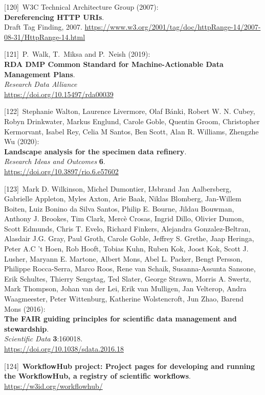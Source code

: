 {[}120{]}~W3C Technical Architecture Group (2007):\\
\textbf{Dereferencing HTTP URIs}.\\
Draft Tag Finding, 2007.
\url{https://www.w3.org/2001/tag/doc/httpRange-14/2007-08-31/HttpRange-14.html}

{[}121{]}~P.~Walk, T.~Miksa and P.~Neish (2019):\\
\textbf{RDA DMP Common Standard for Machine-Actionable Data Management
Plans}.\\
\emph{Research Data Alliance}\\
\url{https://doi.org/10.15497/rda00039}

{[}122{]}~Stephanie Walton, Laurence Livermore, Olaf Bánki, Robert W. N.
Cubey, Robyn Drinkwater, Markus Englund, Carole Goble, Quentin Groom,
Christopher Kermorvant, Isabel Rey, Celia M Santos, Ben Scott, Alan R.
Williams, Zhengzhe Wu (2020):\\
\textbf{Landscape analysis for the specimen data refinery}.\\
\emph{Research Ideas and Outcomes} \textbf{6}.\\
\url{https://doi.org/10.3897/rio.6.e57602}

{[}123{]}~Mark D. Wilkinson, Michel Dumontier, IJsbrand Jan Aalbersberg,
Gabrielle Appleton, Myles Axton, Arie Baak, Niklas Blomberg, Jan-Willem
Boiten, Luiz Bonino da Silva Santos, Philip E. Bourne, Jildau Bouwman,
Anthony J. Brookes, Tim Clark, Mercè Crosas, Ingrid Dillo, Olivier
Dumon, Scott Edmunds, Chris T. Evelo, Richard Finkers, Alejandra
Gonzalez-Beltran, Alasdair J.G. Gray, Paul Groth, Carole Goble, Jeffrey
S. Grethe, Jaap Heringa, Peter A.C 't Hoen, Rob Hooft, Tobias Kuhn,
Ruben Kok, Joost Kok, Scott J. Lusher, Maryann E. Martone, Albert Mons,
Abel L. Packer, Bengt Persson, Philippe Rocca-Serra, Marco Roos, Rene
van Schaik, Susanna-Assunta Sansone, Erik Schultes, Thierry Sengstag,
Ted Slater, George Strawn, Morris A. Swertz, Mark Thompson, Johan van
der Lei, Erik van Mulligen, Jan Velterop, Andra Waagmeester, Peter
Wittenburg, Katherine Wolstencroft, Jun Zhao, Barend Mons (2016):\\
\textbf{The FAIR guiding principles for scientific data management and
stewardship}.\\
\emph{Scientific Data} \textbf{3}:160018.\\
\url{https://doi.org/10.1038/sdata.2016.18}

{[}124{]}~\textbf{WorkflowHub project: Project pages for developing and
running the WorkflowHub, a registry of scientific workflows}.\\
\url{https://w3id.org/workflowhub/}

